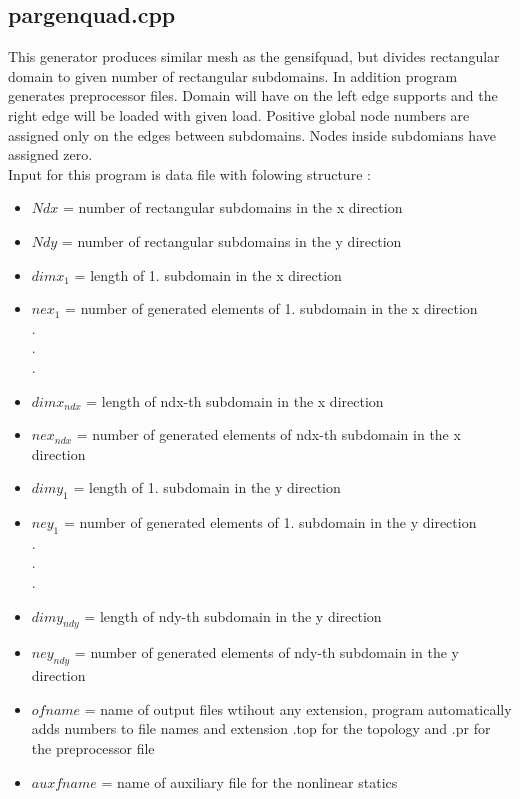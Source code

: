 \documentclass[12pt]{book}
\begin{document}
\subsection{pargenquad.cpp}

 This generator produces similar mesh as the gensifquad, but divides rectangular domain to given
number of rectangular subdomains. In addition program generates preprocessor files.
Domain will have on the left edge supports and the right edge will be loaded with given load.
Positive global node numbers are assigned  only on the edges between subdomains. Nodes inside subdomians
have assigned zero.\\
 Input for this program is data file with folowing structure :
\begin{itemize}
\item $Ndx$    = number of rectangular subdomains in the x direction
\item $Ndy$    = number of rectangular subdomains in the y direction
\item $dimx_1$ = length of 1. subdomain in the x direction
\item $nex_1$  = number of generated elements of 1. subdomain in the x direction\\
.\\
.\\
.\\
\item $dimx_{ndx}$ = length of ndx-th subdomain in the x direction
\item $nex_{ndx}$  = number of generated elements of ndx-th subdomain in the x direction
\item $dimy_1$   = length of 1. subdomain in the y direction
\item $ney_1$    = number of generated elements of 1. subdomain in the y direction\\
.\\
.\\
.\\
\item $dimy_{ndy}$  = length of ndy-th subdomain in the y direction
\item $ney_{ndy}$   = number of generated elements of ndy-th subdomain in the y direction
\item $ofname$    = name of output files wtihout any extension, program automatically adds numbers to file names and
            extension .top for the topology and .pr for the preprocessor file
\item $auxfname$  = name of auxiliary file for the nonlinear statics

\end{itemize}
\end{document}
